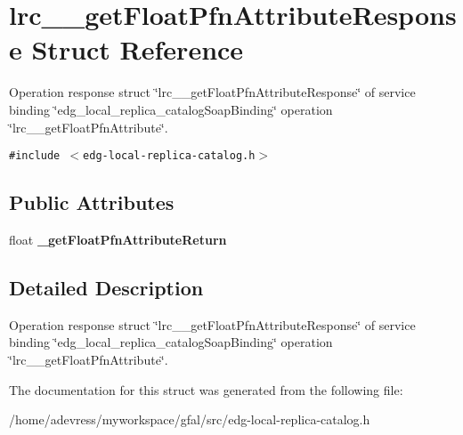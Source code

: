 \section{lrc\_\-\_\-get\-Float\-Pfn\-Attribute\-Response Struct Reference}
\label{structlrc____getFloatPfnAttributeResponse}
Operation response struct \char`\"{}lrc\_\-\_\-get\-Float\-Pfn\-Attribute\-Response\char`\"{} of service binding \char`\"{}edg\_\-local\_\-replica\_\-catalog\-Soap\-Binding\char`\"{} operation \char`\"{}lrc\_\-\_\-get\-Float\-Pfn\-Attribute\char`\"{}.  


{\tt \#include $<$edg-local-replica-catalog.h$>$}

\subsection*{Public Attributes}
\begin{CompactItemize}
\item 
float \textbf{\_\-get\-Float\-Pfn\-Attribute\-Return}\label{structlrc____getFloatPfnAttributeResponse_ea3a6fc88d1bbb38087c2a669069044d}

\end{CompactItemize}


\subsection{Detailed Description}
Operation response struct \char`\"{}lrc\_\-\_\-get\-Float\-Pfn\-Attribute\-Response\char`\"{} of service binding \char`\"{}edg\_\-local\_\-replica\_\-catalog\-Soap\-Binding\char`\"{} operation \char`\"{}lrc\_\-\_\-get\-Float\-Pfn\-Attribute\char`\"{}. 



The documentation for this struct was generated from the following file:\begin{CompactItemize}
\item 
/home/adevress/myworkspace/gfal/src/edg-local-replica-catalog.h\end{CompactItemize}
